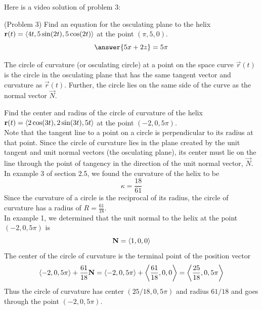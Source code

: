 \documentclass[handout]{ximera}
\begin{document}
Here is a video solution of problem 3:\\

\begin{problem}(Problem 3)
Find an equation for the osculating plane to the helix $\mathbf r(t) = \left\langle 4t, 5 \sin(2t),5\cos(2t)\right\rangle$ at the point $(\pi, 5, 0)$.\\
\[
\answer{5x + 2z } = 5\pi
\]
\end{problem}

\begin{foldable}
\end{foldable}


\begin{definition}
The circle of curvature (or osculating circle) at a point on the space curve $\vec r(t)$ is the circle in 
the osculating plane that has the same tangent vector and curvature as $\vec r(t)$.  
Further, the circle lies on the same side of the curve as the normal vector $\vec N$.
\end{definition}

\begin{example}[Example 4]
Find the center and radius of the circle of curvature of the helix $\mathbf r(t) =  \left\langle 2\cos(3t), 2\sin(3t), 5t\right\rangle$ at the point $(-2, 0, 5\pi)$.\\

Note that the tangent line to a point on a circle is perpendicular to its radius at that point. 
Since the circle of curvature lies in the plane created by the unit tangent and unit normal vectors (the osculating plane),
its center must lie on the line through the point of tangency in the direction of the unit normal vector, $\vec N$.\\

In example 3 of section 2.5, we found the curvature of the helix to be 
\[
\kappa = \frac{18}{61}
\]
Since the curvature of a circle is the reciprocal of its radius, the circle of curvature has a radius of $R = \frac{61}{18}$.\\

In example 1, we determined that the unit normal to the helix at the point $(-2, 0, 5\pi)$ is
\[
\mathbf N = \left\langle 1, 0, 0\right\rangle
\]
The center of the circle of curvature is the terminal point of the position vector 
\[
\left\langle -2, 0, 5\pi\right\rangle + \frac{61}{18}\mathbf N = \left\langle -2, 0, 5\pi\right\rangle + \left\langle \frac{61}{18}, 0, 0\right\rangle = \left\langle \frac{25}{18} , 0, 5\pi\right\rangle
\]
Thus the circle of curvature has center $(25/18, 0, 5\pi)$ and radius $61/18$ and goes through the point $(-2, 0, 5\pi)$.
\end{example}
\end{document}
